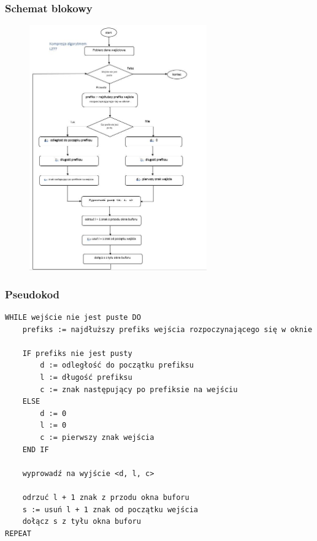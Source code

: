\documentclass{article}
\begin{document}
\subsubsection{Schemat blokowy}
\begin{figure}[h!]
\centering
\includegraphics[height=400px]{img/schemat_lz77.JPG}
\end{figure}

\subsubsection{Pseudokod}
\begin{verbatim}
WHILE wejście nie jest puste DO
    prefiks := najdłuższy prefiks wejścia rozpoczynającego się w oknie
    
    IF prefiks nie jest pusty
        d := odległość do początku prefiksu
        l := długość prefiksu
        c := znak następujący po prefiksie na wejściu
    ELSE
        d := 0
        l := 0
        c := pierwszy znak wejścia
    END IF
    
    wyprowadź na wyjście <d, l, c>
    
    odrzuć l + 1 znak z przodu okna buforu
    s := usuń l + 1 znak od początku wejścia
    dołącz s z tyłu okna buforu
REPEAT
\end{verbatim}
\end{document}

